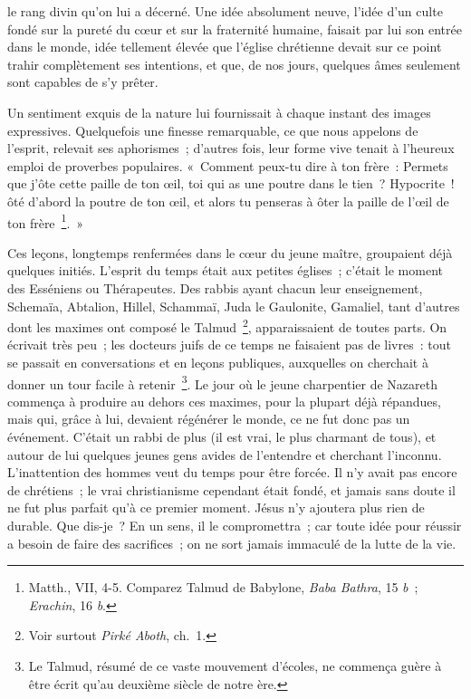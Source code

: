 \documentclass[french,twoside]{book} %
\begin{document}
le rang divin qu’on lui a décerné. Une idée absolument neuve, l’idée d’un culte fondé sur la pureté du cœur et sur la fraternité humaine, faisait par lui son entrée dans le monde, idée tellement élevée que l’église chrétienne devait sur ce point trahir complètement ses intentions, et que, de nos jours, quelques âmes seulement sont capables de s’y prêter.\par
Un sentiment exquis de la nature lui fournissait à chaque instant des images expressives. Quelquefois une finesse remarquable, ce que nous appelons de l’esprit, relevait ses aphorismes ; d’autres fois, leur forme vive tenait à l’heureux emploi de proverbes populaires. « Comment peux-tu dire à ton frère : Permets que j’ôte cette paille de ton œil, toi qui as une poutre dans le tien ? Hypocrite ! ôté d’abord la poutre de ton œil, et alors tu penseras à ôter la paille de l’œil de ton frère \footnote{ Matth., VII, 4-5. Comparez Talmud de Babylone, {\itshape Baba Bathra}, 15 {\itshape b} ; {\itshape Erachin}, 16 {\itshape b}.}. »\par
Ces leçons, longtemps renfermées dans le cœur du jeune maître, groupaient déjà quelques initiés. L’esprit du temps était aux petites églises ; c’était le moment des Esséniens ou Thérapeutes. Des rabbis ayant chacun leur enseignement, Schemaïa, Abtalion, Hillel, Schammaï, Juda le Gaulonite, Gamaliel, tant d’autres dont les maximes ont composé le Talmud \footnote{ Voir surtout {\itshape Pirké Aboth}, ch. 1.}, apparaissaient de toutes parts. On écrivait très peu ; les docteurs juifs de ce temps ne faisaient pas de livres : tout se passait en conversations et en leçons publiques, auxquelles on cherchait à donner un tour facile à retenir \footnote{Le Talmud, résumé de ce vaste mouvement d’écoles, ne commença guère à être écrit qu’au deuxième siècle de notre ère.}. Le jour où le jeune charpentier de Nazareth commença à produire au dehors ces maximes, pour la plupart déjà répandues, mais qui, grâce à lui, devaient régénérer le monde, ce ne fut donc pas un événement. C’était un rabbi de plus (il est vrai, le plus charmant de tous), et autour de lui quelques jeunes gens avides de l’entendre et cherchant l’inconnu. L’inattention des hommes veut du temps pour être forcée. Il n’y avait pas encore de chrétiens ; le vrai christianisme cependant était fondé, et jamais sans doute il ne fut plus parfait qu’à ce premier moment. Jésus n’y ajoutera plus rien de durable. Que dis-je ? En un sens, il le compromettra ; car toute idée pour réussir a besoin de faire des sacrifices ; on ne sort jamais immaculé de la lutte de la vie.\par
\end{document}
